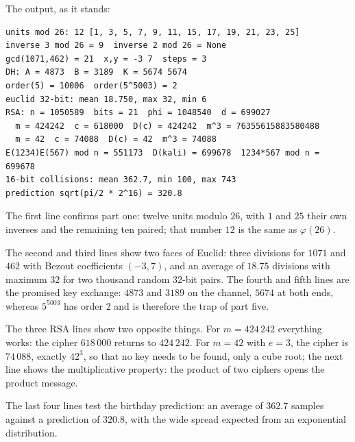 \begin{lab}
The output, as it stands:

\begin{verbatim}
units mod 26: 12 [1, 3, 5, 7, 9, 11, 15, 17, 19, 21, 23, 25]
inverse 3 mod 26 = 9  inverse 2 mod 26 = None
gcd(1071,462) = 21  x,y = -3 7  steps = 3
DH: A = 4873  B = 3189  K = 5674 5674
order(5) = 10006  order(5^5003) = 2
euclid 32-bit: mean 18.750, max 32, min 6
RSA: n = 1050589  bits = 21  phi = 1048540  d = 699027
  m = 424242  c = 618000  D(c) = 424242  m^3 = 76355615883580488
  m = 42  c = 74088  D(c) = 42  m^3 = 74088
E(1234)E(567) mod n = 551173  D(kali) = 699678  1234*567 mod n = 699678
16-bit collisions: mean 362.7, min 100, max 743
prediction sqrt(pi/2 * 2^16) = 320.8
\end{verbatim}
\end{lab}

The first line confirms part one: twelve units modulo $26$, with $1$ and $25$ their own inverses and
the remaining ten paired; that number $12$ is the same as $\varphi(26)$.

The second and third lines show two faces of Euclid: three divisions for $1071$ and $462$ with Bezout
coefficients $(-3,7)$, and an average of $18.75$ divisions with maximum $32$ for two thousand random
$32$-bit pairs. The fourth and fifth lines are the promised key exchange: $4873$ and $3189$ on the
channel, $5674$ at both ends, whereas $5^{5003}$ has order $2$ and is therefore the trap of part five.

The three RSA lines show two opposite things. For $m=424\,242$ everything works: the cipher
$618\,000$ returns to $424\,242$. For $m=42$ with $e=3$, the cipher is $74\,088$, exactly $42^3$, so
that no key needs to be found, only a cube root; the next line shows the multiplicative property: the
product of two ciphers opens the product message.

The last four lines test the birthday prediction: an average of $362.7$ samples against a prediction
of $320.8$, with the wide spread expected from an exponential distribution.

